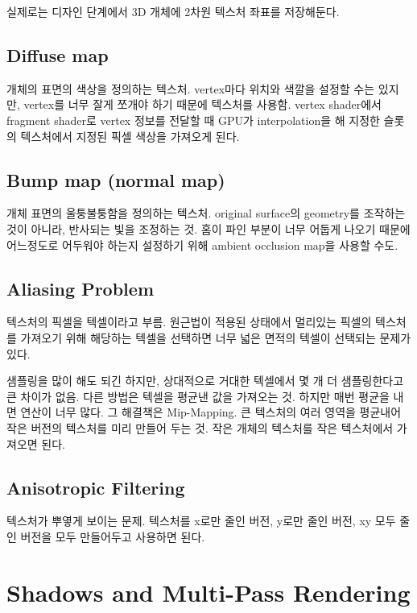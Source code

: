 실제로는 디자인 단계에서 3D 개체에 2차원 텍스처 좌표를 저장해둔다.

\subsection{Diffuse map}

개체의 표면의 색상을 정의하는 텍스처. vertex마다 위치와 색깔을 설정할 수는 있지만, vertex를 너무 잘게 쪼개야 하기 때문에 텍스처를 사용함. vertex shader에서 fragment shader로 vertex 정보를 전달할 때 GPU가 interpolation을 해 지정한 슬롯의 텍스처에서 지정된 픽셀 색상을 가져오게 된다.

\subsection{Bump map (normal map)}

개체 표면의 울퉁불퉁함을 정의하는 텍스처. original surface의 geometry를 조작하는 것이 아니라, 반사되는 빛을 조정하는 것. 홈이 파인 부분이 너무 어둡게 나오기 때문에 어느정도로 어두워야 하는지 설정하기 위해 ambient occlusion map을 사용할 수도.

\subsection{Aliasing Problem}

텍스처의 픽셀을 텍셀이라고 부름. 원근법이 적용된 상태에서 멀리있는 픽셀의 텍스처를 가져오기 위해 해당하는 텍셀을 선택하면 너무 넓은 면적의 텍셀이 선택되는 문제가 있다.

샘플링을 많이 해도 되긴 하지만, 상대적으로 거대한 텍셀에서 몇 개 더 샘플링한다고 큰 차이가 없음. 다른 방법은 텍셀을 평균낸 값을 가져오는 것. 하지만 매번 평균을 내면 연산이 너무 많다. 그 해결책은 Mip-Mapping. 큰 텍스처의 여러 영역을 평균내어 작은 버전의 텍스처를 미리 만들어 두는 것. 작은 개체의 텍스처를 작은 텍스처에서 가져오면 된다.

\subsection{Anisotropic Filtering}

텍스처가 뿌옇게 보이는 문제. 텍스처를 x로만 줄인 버전, y로만 줄인 버전, xy 모두 줄인 버전을 모두 만들어두고 사용하면 된다.

\section{Shadows and Multi-Pass Rendering}

